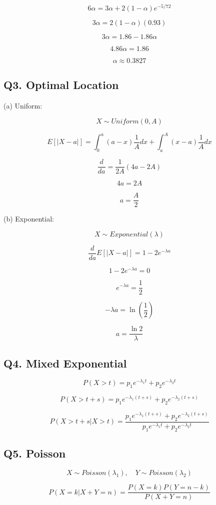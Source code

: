 \documentclass{article}
\begin{document}
\[
6\alpha = 3\alpha + 2(1-\alpha)e^{-5/72}
\]

\[
3\alpha = 2(1-\alpha)(0.93)
\]

\[
3\alpha = 1.86 - 1.86\alpha
\]

\[
4.86\alpha = 1.86
\]

\[
\alpha \approx 0.3827
\]

\subsection*{Q3. Optimal Location}

(a) Uniform:

\[
X \sim Uniform(0,A)
\]

\[
E[|X-a|] = \int_0^a (a-x)\frac{1}{A}dx + \int_a^A (x-a)\frac{1}{A}dx
\]

\[
\frac{d}{da} = \frac{1}{2A}(4a - 2A)
\]

\[
4a = 2A
\]

\[
a = \frac{A}{2}
\]

(b) Exponential:

\[
X \sim Exponential(\lambda)
\]

\[
\frac{d}{da} E[|X-a|] = 1 - 2e^{-\lambda a}
\]

\[
1 - 2e^{-\lambda a} = 0
\]

\[
e^{-\lambda a} = \frac{1}{2}
\]

\[
-\lambda a = \ln\left(\frac{1}{2}\right)
\]

\[
a = \frac{\ln 2}{\lambda}
\]

\subsection*{Q4. Mixed Exponential}

\[
P(X>t) = p_1 e^{-\lambda_1 t} + p_2 e^{-\lambda_2 t}
\]

\[
P(X>t+s) = p_1 e^{-\lambda_1 (t+s)} + p_2 e^{-\lambda_2 (t+s)}
\]

\[
P(X>t+s|X>t) = \frac{p_1 e^{-\lambda_1 (t+s)} + p_2 e^{-\lambda_2 (t+s)}}{p_1 e^{-\lambda_1 t} + p_2 e^{-\lambda_2 t}}
\]

\subsection*{Q5. Poisson}

\[
X \sim Poisson(\lambda_1), \quad Y \sim Poisson(\lambda_2)
\]

\[
P(X=k|X+Y=n) = \frac{P(X=k)P(Y=n-k)}{P(X+Y=n)}
\]
\end{document}
